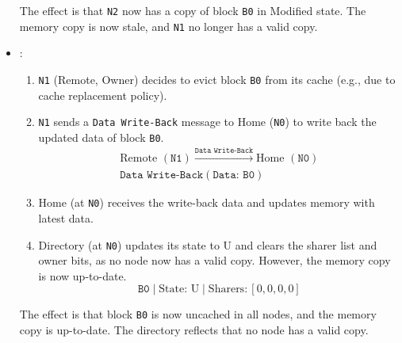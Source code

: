 \begin{itemize}
\begin{figure}[!htp]
    \end{figure}
    The effect is that \texttt{N2} now has a copy of block \texttt{B0} in Modified state. The memory copy is now stale, and \texttt{N1} no longer has a valid copy.


    \newpage


    \item {}:
    \begin{enumerate}
        \item \texttt{N1} (Remote, Owner) decides to evict block \texttt{B0} from its cache (e.g., due to cache replacement policy).

        \item \texttt{N1} sends a \texttt{Data Write-Back} message to Home (\texttt{N0}) to write back the updated data of block \texttt{B0}.
        \begin{gather*}
            \text{Remote } (\texttt{N1}) \xrightarrow{\texttt{Data Write-Back}} \text{Home } (\texttt{N0})
            \\[.3em]
            \texttt{Data Write-Back}(\texttt{Data: B0})
        \end{gather*}

        \item Home (at \texttt{N0}) receives the write-back data and updates memory with latest data.

        \item Directory (at \texttt{N0}) updates its state to U and clears the sharer list and owner bits, as no node now has a valid copy. However, the memory copy is now up-to-date.
        \begin{equation*}
            \texttt{B0} \; | \; \text{State: U} \; | \; \text{Sharers:} \, \left[0, 0, 0, 0\right]
        \end{equation*}
    \end{enumerate}
    The effect is that block \texttt{B0} is now uncached in all nodes, and the memory copy is up-to-date. The directory reflects that no node has a valid copy.
\end{itemize}